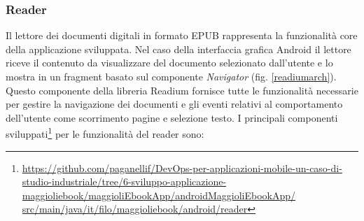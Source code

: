\subsubsection*{Reader}
Il lettore dei documenti digitali in formato EPUB rappresenta la funzionalità core della applicazione sviluppata. Nel caso della interfaccia grafica Android il lettore riceve il contenuto da visualizzare del documento selezionato dall'utente e lo mostra in un fragment basato sul componente \textit{Navigator} (fig. \ref{readiumarch}). Questo componente della libreria Readium fornisce tutte le funzionalità necessarie per gestire la navigazione dei documenti e gli eventi relativi al comportamento dell'utente come scorrimento pagine e selezione testo. I principali componenti sviluppati\footnote{\href{https://github.com/paganellif/DevOps-per-applicazioni-mobile-un-caso-di-studio-industriale/tree/6-sviluppo-applicazione-maggioliebook/maggioliEbookApp/androidMaggioliEbookApp/src/main/java/it/filo/maggioliebook/android/reader}{https://github.com/paganellif/DevOps-per-applicazioni-mobile-un-caso-di-studio-industriale/tree/6-sviluppo-applicazione-maggioliebook/maggioliEbookApp/androidMaggioliEbookApp/\\src/main/java/it/filo/maggioliebook/android/reader}} per le funzionalità del reader sono:

